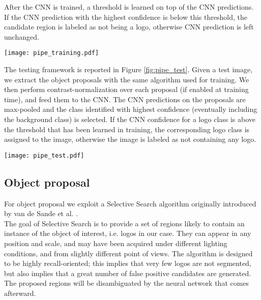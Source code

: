 \documentclass[final,5p,twocolumn]{elsarticle}
\begin{document}
After the CNN is trained, a threshold is learned on top of the CNN predictions. If the CNN prediction with the highest confidence is below this threshold, the candidate region is labeled as not being a logo, otherwise CNN prediction is left unchanged.


\begin{figure*}[htbpp]
	\texttt{[image: pipe\_training.pdf]}
\centering
	\caption{Logo recognition training framework.}
	\label{fig:pipe_training}
\end{figure*}


The testing framework is reported in Figure \ref{fig:pipe_test}.
Given a test image, we extract the object proposals with the same algorithm used for training.
We then perform contrast-normalization over each proposal (if enabled at training time), and feed them to the CNN. The CNN predictions on the proposals are max-pooled and the class identified with highest confidence (eventually including the background class) is selected. If the CNN confidence for a logo class is above the threshold that has been learned in training, the corresponding logo class is assigned to the image, otherwise the image is labeled as not containing any logo.

\begin{figure*}[htbpp]
	\texttt{[image: pipe\_test.pdf]}
	\centering
	\caption{Logo recognition testing framework.}
	\label{fig:pipe_test}
\end{figure*}



\subsection{Object proposal}
\label{subsec:selective}
For object proposal we exploit a Selective Search algorithm originally introduced by van de Sande et al. \cite{vandeSandeICCV2011,UijlingsIJCV2013}.\\
The goal of Selective Search is to provide a set of regions likely to contain an instance of the object of interest, i.e. logos in our case. They can appear in any position and scale, and may have been acquired under different lighting conditions, and from slightly different point of views.
The algorithm is designed to be highly recall-oriented; this implies that very few logos are not segmented, but also implies that a great number of false positive candidates are generated. The proposed regions will be disambiguated by the neural network that comes afterward.
\end{document}
